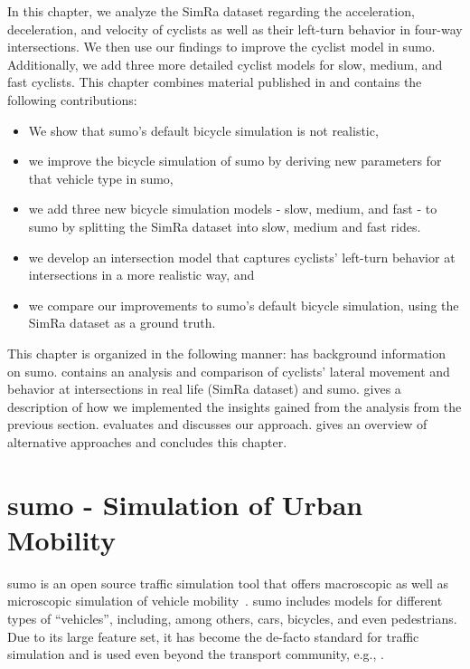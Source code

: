 In this chapter, we analyze the SimRa dataset regarding the acceleration, deceleration, and velocity of cyclists as well as their left-turn behavior in four-way intersections.
We then use our findings to improve the cyclist model in \ac{sumo}.
Additionally, we add three more detailed cyclist models for slow, medium, and fast cyclists.
This chapter combines material published in \cite{karakaya2022realistic,karakaya2023achieving} and contains the following contributions:
\begin{itemize}
    \item We show that \ac{sumo}'s default bicycle simulation is not realistic,
    \item we improve the bicycle simulation of \ac{sumo} by deriving new parameters for that vehicle type in \ac{sumo},
    \item we add three new bicycle simulation models - slow, medium, and fast - to \ac{sumo} by splitting the SimRa dataset into slow, medium and fast rides.
    \item we develop an intersection model that captures cyclists' left-turn behavior at intersections in a more realistic way, and
    \item we compare our improvements to \ac{sumo}'s default bicycle simulation, using the SimRa dataset as a ground truth.
\end{itemize}

This chapter is organized in the following manner:
 has background information on \ac{sumo}.
 contains an analysis and comparison of cyclists' lateral movement and behavior at intersections in real life (SimRa dataset) and \ac{sumo}.
 gives a description of how we implemented the insights gained from the analysis from the previous section.
 evaluates and  discusses our approach.
 gives an overview of alternative approaches and  concludes this chapter.

\section{\ac{sumo} - Simulation of Urban Mobility}
\label{sec:sumo_background}
\ac{sumo} is an open source traffic simulation tool that offers macroscopic as well as microscopic simulation of vehicle mobility~\cite{lopez2018microscopic}.
\ac{sumo} includes models for different types of ``vehicles'', including, among others, cars, bicycles, and even pedestrians.
Due to its large feature set, it has become the de-facto standard for traffic simulation and is used even beyond the transport community, e.g., \cite{beilharz2021towards}.

